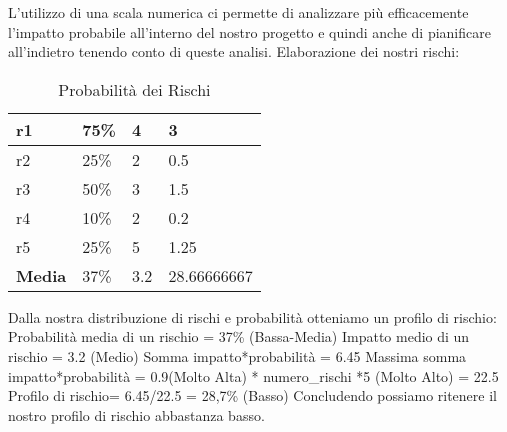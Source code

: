 	L’utilizzo di una scala numerica ci permette di analizzare più efficacemente l’impatto probabile all’interno del nostro progetto e quindi anche di pianificare all’indietro tenendo conto di queste analisi.
	Elaborazione dei nostri rischi:
	\begin{table}[!htpb]
		\centering
		\renewcommand{\arraystretch}{2} 
		\begin{tabular}{|l|l|l|l|}
			\hline
			r1 & 75\% & 4 & 3 \\
			\hline
			r2 &  25\%  & 2  & 0.5 \\
			\hline
			r3  & 50\%  & 3  & 1.5 \\
			\hline
			r4  & 10\% &  2 &  0.2 \\
			\hline
			r5  & 25\%  & 5  & 1.25 \\
			\hline
			\textbf{Media}  & 37\% &  3.2 &  28.66666667\\
			\hline
		\end{tabular}
		\caption{Probabilità dei Rischi}
	\end{table}
	\newline
	Dalla nostra distribuzione di rischi e probabilità otteniamo un profilo di rischio:\newline
	Probabilità media di un rischio = 37\% (Bassa-Media)\newline
	Impatto medio di un rischio = 3.2 (Medio)\newline
	Somma impatto*probabilità = 6.45\newline
	Massima somma impatto*probabilità = 0.9(Molto Alta) * numero\_rischi *5 (Molto Alto) = 22.5\newline
	Profilo di rischio= 6.45/22.5 = 28,7\% (Basso)\newline
	Concludendo possiamo ritenere il nostro profilo di rischio abbastanza basso.